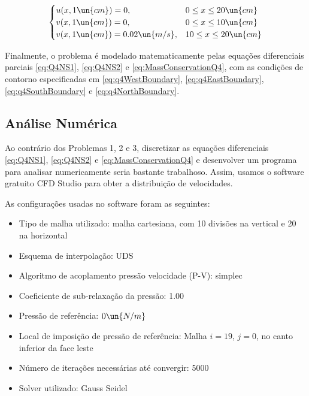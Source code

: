 \begin{equation}\label{eq:q4NorthBoundary}
    \begin{cases}
        u(x, 1 \un{cm}) = 0, & 0 \leq x \leq 20 \un{cm}  \\
        v(x, 1 \un{cm}) = 0, & 0 \leq x \leq 10 \un{cm}  \\
        v(x, 1 \un{cm}) = 0.02 \un{m/s}, & 10 \leq x \leq 20 \un{cm}  \\
    \end{cases}
\end{equation}

Finalmente, o problema é modelado matematicamente pelas equações diferenciais parciais
\eqref{eq:Q4NS1}, \eqref{eq:Q4NS2} e \eqref{eq:MassConservationQ4}, com as condições de 
contorno especificadas em \eqref{eq:q4WestBoundary}, \eqref{eq:q4EastBoundary}, 
\eqref{eq:q4SouthBoundary} e \eqref{eq:q4NorthBoundary}.

\subsection{Análise Numérica}

Ao contrário dos Problemas 1, 2 e 3, discretizar as equações diferenciais \eqref{eq:Q4NS1}, \eqref{eq:Q4NS2} e \eqref{eq:MassConservationQ4}
e desenvolver um programa para analisar numericamente seria bastante trabalhoso. Assim, 
usamos o software gratuito CFD Studio para obter a distribuição de velocidades. 

As configurações usadas no software foram as seguintes:

\begin{itemize}
    \item Tipo de malha utilizado: malha cartesiana, com 10 divisões na vertical e 20 na horizontal
    \item Esquema de interpolação: UDS
    \item Algoritmo de acoplamento pressão velocidade (P-V): simplec
    \item Coeficiente de sub-relaxação da pressão: 1.00
    \item Pressão de referência: $0 \un{N/m}$
    \item Local de imposição de pressão de referência: Malha $i = 19$, $j = 0$, no canto inferior da face leste
    \item Número de iterações necessárias até convergir: 5000
    \item Solver utilizado: Gauss Seidel
\end{itemize}

